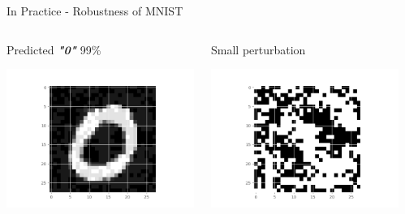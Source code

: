 \documentclass[t,compress,aspectratio=169]{beamer}
\begin{document}
\begin{frame}{In Practice - Robustness of MNIST}

   \begin{columns}
        \begin{column}{0.3\textwidth}
            \begin{center}
                        Predicted \textit{\textbf{"0"}} 99\%

             \includegraphics[width=\textwidth]{img/true.png}
             \end{center}
        \end{column}
        \begin{column}{0.3\textwidth}  %

            \begin{center}
                        Small perturbation

             \includegraphics[width=\textwidth]{img/eta.png}
             \end{center}
        \end{column}
          \begin{column}{0.32\textwidth}  %


\end{column}
\end{columns}
\end{frame}
\end{document}
